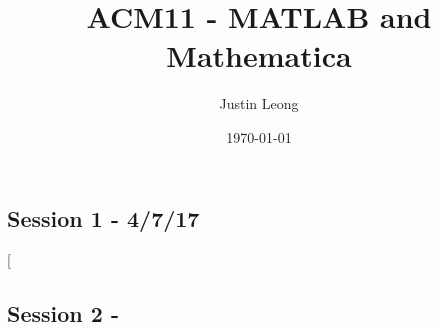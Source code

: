 \documentclass[10pt]{article}
\title{\textbf{ACM11 - MATLAB and Mathematica}}
\author{Justin Leong}
\date{\today}
\begin{document}
\maketitle
\setlength\parindent{0pt}

\begin{description}
\section{Session 1 - 4/7/17}
\item[
\end{description}

\begin{description}
\section{Session 2 - }
\end{description}
\end{document}
